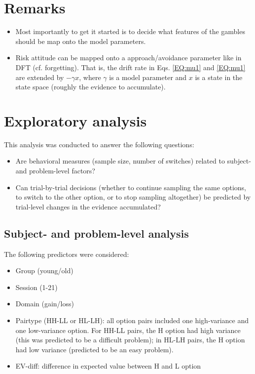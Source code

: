 \documentclass[english,doc]{apa}
\begin{document}
\section{Remarks}
\begin{itemize}
\item Most importantly to get it started is to decide what features of the gambles should be  map onto the model parameters. 
\item Risk attitude can be mapped onto a approach/avoidance parameter like in DFT (cf. forgetting). That is, the drift rate in Eqs. \ref{EQ:mu1} and \ref{EQ:mu1} are extended by $-\gamma x$, where $\gamma$ is a model parameter and $x$ is a state in the state space (roughly the evidence to accumulate). 
\end{itemize}



\section{Exploratory analysis}

This analysis was conducted to answer the following questions:

\begin{itemize}
\item Are behavioral measures (sample size, number of switches) related to subject- and problem-level factors?
\item Can trial-by-trial decisions (whether to continue sampling the same options, to switch to the other option, or to stop sampling altogether) be predicted by trial-level changes in the evidence accumulated?	
\end{itemize}




\subsection{Subject- and problem-level analysis}

The following predictors were considered:

\begin{itemize}
\item Group (young/old)
\item Session (1-21)
\item Domain (gain/loss)
\item Pairtype (HH-LL or HL-LH): all option pairs included one high-variance and one low-variance option. For HH-LL pairs, the H option had high variance (this was predicted to be a difficult problem); in HL-LH pairs, the H option had low variance (predicted to be an easy problem).
\item EV-diff: difference in expected value between H and L option
\end{itemize}
\end{document}
